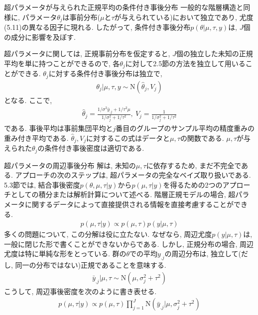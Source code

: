 \documentclass[10pt,dvipdfmx,a4]{beamer}
\newcommand{\eq}[1]{\begin{align}#1\end{align}}
\newcommand{\eqn}[1]{\begin{align*}#1\end{align*}}
\begin{document}
\begin{frame}{超パラメータが与えられた正規平均の条件付き事後分布}
一般的な階層構造と同様に, パラメータ$\theta_j$は事前分布($\mu$と$\tau$が与えられている)において独立であり, 尤度(5.11)の異なる因子に現れる.
したがって, 条件付き事後分布$p(\theta|\mu,\tau,y)$は, $J$個の成分に影響を及ぼす.

超パラメータに関しては, 正規事前分布を仮定すると, $J$個の独立した未知の正規平均を単に持つことができるので, 各$\theta_j$に対して2.5節の方法を独立して用いることができる.
$\theta_j$に対する条件付き事後分布は独立で,
\eqn{\theta_j|\mu,\tau,y\sim\text{N}(\hat{\theta}_j,V_j)}
となる.
ここで, 
\eq{\hat{\theta}_j=\tfrac{1/\sigma^2 \bar{y}_{.j}+1/\tau^2\mu}{1/\sigma_j^2+1/\tau^2},\ V_j=\tfrac{1}{1/\sigma_j^2+1/\tau^2}}
である.
事後平均は事前集団平均と$j$番目のグループのサンプル平均の精度重みの重み付き平均である.
$\hat{\theta}_j, V_j$に対するこの式はデータと$\mu,\tau$の関数である.
$\mu, \tau$が与えられた$\theta_j$の条件付き事後密度は適切である.
\end{frame}


\begin{frame}{超パラメータの周辺事後分布}
解は, 未知の$\mu,\tau$に依存するため, まだ不完全である.
アプローチの次のステップは, 超パラメータの完全なベイズ取り扱いである.
5.3節では, 結合事後密度$p(\theta,\mu,\tau|y)$から$p(\mu,\tau|y)$を得るための2つのアプローチとしての積分または解析計算について述べる.
階層正規モデルの場合, 超パラメータに関するデータによって直接提供される情報を直接考慮することができる.
\eqn{p(\mu,\tau|y)\propto p(\mu,\tau)p(y|\mu,\tau)}
多くの問題について, この分解は役に立たない.
なぜなら, 周辺尤度$p(y|\mu,\tau)$は, 一般に閉じた形で書くことができないからである.
しかし, 正規分布の場合, 周辺尤度は特に単純な形をとっている.
群の$\theta$での平均$y_{.j}$の周辺分布は, 独立して(だし, 同一の分布ではない)正規であることを意味する.
\eqn{\bar{y}_{.j}|\mu,\tau\sim\text{N}(\mu,\sigma_j^2+\tau^2)}
こうして, 周辺事後密度を次のように書き表せる.
\eq{p(\mu,\tau|y)\propto p(\mu,\tau)\prod_{j=1}^J \text{N}(\bar{y}_{.j}|\mu,\sigma_j^2+\tau^2)}
\end{frame}

\end{document}

